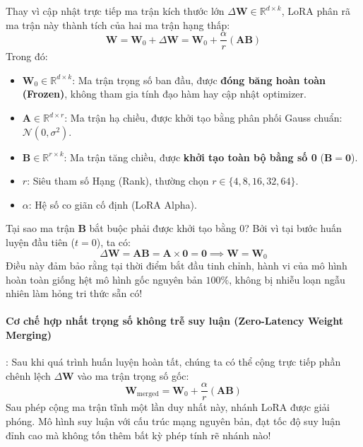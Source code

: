Thay vì cập nhật trực tiếp ma trận kích thước lớn $\Delta \mathbf{W} \in \mathbb{R}^{d \times k}$, LoRA phân rã ma trận này thành tích của hai ma trận hạng thấp:
\begin{equation}
\mathbf{W} = \mathbf{W}_0 + \Delta \mathbf{W} = \mathbf{W}_0 + \frac{\alpha}{r} (\mathbf{A} \mathbf{B})
\end{equation}
Trong đó:
\begin{itemize}
  \item $\mathbf{W}_0 \in \mathbb{R}^{d \times k}$: Ma trận trọng số ban đầu, được \textbf{đóng băng hoàn toàn (Frozen)}, không tham gia tính đạo hàm hay cập nhật optimizer.
  \item $\mathbf{A} \in \mathbb{R}^{d \times r}$: Ma trận hạ chiều, được khởi tạo bằng phân phối Gauss chuẩn: $\mathcal{N}(0, \sigma^2)$.
  \item $\mathbf{B} \in \mathbb{R}^{r \times k}$: Ma trận tăng chiều, được \textbf{khởi tạo toàn bộ bằng số 0} ($\mathbf{B} = \mathbf{0}$).
  \item $r$: Siêu tham số Hạng (Rank), thường chọn $r \in \{4, 8, 16, 32, 64\}$.
  \item $\alpha$: Hệ số co giãn cố định (LoRA Alpha).
\end{itemize}

\begin{note}
Tại sao ma trận $\mathbf{B}$ bắt buộc phải được khởi tạo bằng $0$?
Bởi vì tại bước huấn luyện đầu tiên ($t=0$), ta có:
\begin{equation}
\Delta \mathbf{W} = \mathbf{A} \mathbf{B} = \mathbf{A} \times \mathbf{0} = \mathbf{0} \implies \mathbf{W} = \mathbf{W}_0
\end{equation}
Điều này đảm bảo rằng tại thời điểm bắt đầu tinh chỉnh, hành vi của mô hình hoàn toàn giống hệt mô hình gốc nguyên bản $100\%$, không bị nhiễu loạn ngẫu nhiên làm hỏng tri thức sẵn có!
\end{note}

\paragraph{Cơ chế hợp nhất trọng số không trễ suy luận (Zero-Latency Weight Merging)}:
Sau khi quá trình huấn luyện hoàn tất, chúng ta có thể cộng trực tiếp phần chênh lệch $\Delta \mathbf{W}$ vào ma trận trọng số gốc:
\begin{equation}
\mathbf{W}_{\text{merged}} = \mathbf{W}_0 + \frac{\alpha}{r} (\mathbf{A} \mathbf{B})
\end{equation}
Sau phép cộng ma trận tĩnh một lần duy nhất này, nhánh LoRA được giải phóng. Mô hình suy luận với cấu trúc mạng nguyên bản, đạt tốc độ suy luận đỉnh cao mà không tốn thêm bất kỳ phép tính rẽ nhánh nào!

